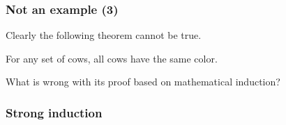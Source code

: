 \begin{frame}\frametitle{Not an example (3)}
  Clearly the following theorem cannot be true.

  \begin{tcolorbox}
    \begin{theorem}
      For any set of cows, all cows have the same color.
    \end{theorem}
  \end{tcolorbox}

  What is wrong with its proof based on mathematical induction?
  
\end{frame}

\begin{frame}\frametitle{Strong induction}
\end{frame}
